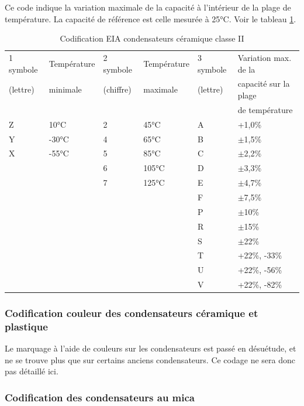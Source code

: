 \documentclass[a4paper]{article}
\begin{document}
Ce code indique la variation maximale de la capacité à l'intérieur de la plage de température. La capacité de référence est celle mesurée à 25°C. Voir le tableau \ref{Codification_EIA_condensateurs_céramique_classe_II}.

\begin{table}[H]
	\centering
		\begin{tabular}{|l|l||l|l||l|l|}\hline
				1\ier{} symbole & Température & 2\ieme{} symbole & Température & 3\ieme{} symbole & Variation max. de la\\
				(lettre) & minimale & (chiffre) & maximale & (lettre) & capacité sur la plage\\
				 & & & & & de température\\\hline\hline
				Z	& 10°C & 2 & 45°C & A & +1,0\%\\\hline
				Y	& -30°C & 4 & 65°C & B & $\pm$1,5\%\\\hline
				X	& -55°C & 5 & 85°C & C & $\pm$2,2\%\\\hline
				 & & 6 & 105°C & D & $\pm$3,3\%\\\hline
				 & & 7 & 125°C & E & $\pm$4,7\%\\\hline
				 & & & & F & $\pm$7,5\%\\\hline
				 & & & & P & $\pm$10\%\\\hline
				 & & & & R & $\pm$15\%\\\hline
				 & & & & S & $\pm$22\%\\\hline
				 & & & & T & +22\%, -33\%\\\hline
				 & & & & U & +22\%, -56\%\\\hline
				 & & & & V & +22\%, -82\%\\\hline
		\end{tabular}
	\caption{Codification \ac{EIA} condensateurs céramique classe II
		\label{Codification_EIA_condensateurs_céramique_classe_II}}
\end{table}

\subsubsection{Codification couleur des condensateurs céramique et plastique}

Le marquage à l'aide de couleurs sur les condensateurs est passé en désuétude, et ne se trouve plus que sur certains anciens condensateurs. Ce codage ne sera donc pas détaillé ici.

\subsubsection{Codification des condensateurs au mica}
\end{document}
